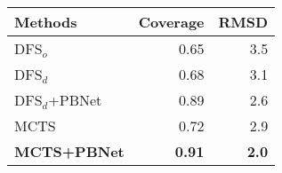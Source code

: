 \documentclass{article}
\begin{document}
\thispagestyle{empty}
\begin{table}[htbp]
    \small
      \begin{tabular}{lrr}
        \toprule
      Methods  & Coverage & RMSD  \\
      \midrule
      DFS$_o$  & 0.65 & 3.5 \\
      DFS$_d$  & 0.68 & 3.1 \\
      DFS$_d$+PBNet  & 0.89 & 2.6 \\
      MCTS  & 0.72  & 2.9 \\
      \textbf{MCTS+PBNet}  & \textbf{0.91} & \textbf{2.0} \\

      \bottomrule
      \end{tabular}%
    \end{table}%
\end{document}
